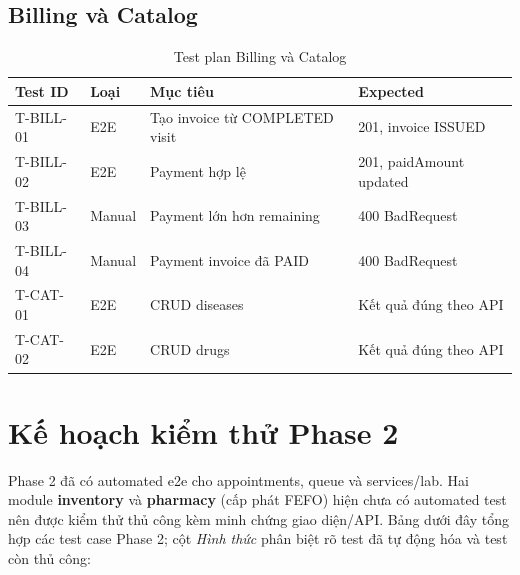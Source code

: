 \subsection{Billing và Catalog}

\begin{table}[H]
\centering
\caption{Test plan Billing và Catalog}
\begin{tabularx}{\textwidth}{|p{2.5cm}|p{2.2cm}|X|p{3.5cm}|}
\hline
\textbf{Test ID} & \textbf{Loại} & \textbf{Mục tiêu} & \textbf{Expected} \\
\hline
T-BILL-01 & E2E & Tạo invoice từ COMPLETED visit & 201, invoice ISSUED \\
\hline
T-BILL-02 & E2E & Payment hợp lệ & 201, paidAmount updated \\
\hline
T-BILL-03 & Manual & Payment lớn hơn remaining & 400 BadRequest \\
\hline
T-BILL-04 & Manual & Payment invoice đã PAID & 400 BadRequest \\
\hline
T-CAT-01 & E2E & CRUD diseases & Kết quả đúng theo API \\
\hline
T-CAT-02 & E2E & CRUD drugs & Kết quả đúng theo API \\
\hline
\end{tabularx}
\end{table}

\section{Kế hoạch kiểm thử Phase 2}

Phase 2 đã có automated e2e cho appointments, queue và services/lab. Hai module \textbf{inventory} và \textbf{pharmacy} (cấp phát FEFO) hiện chưa có automated test nên được kiểm thử thủ công kèm minh chứng giao diện/API. Bảng dưới đây tổng hợp các test case Phase 2; cột \textit{Hình thức} phân biệt rõ test đã tự động hóa và test còn thủ công:

